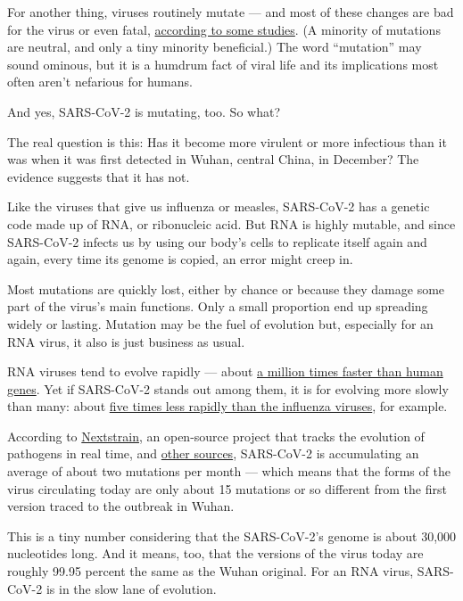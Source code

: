For another thing, viruses routinely mutate --- and most of these
changes are bad for the virus or even fatal,
\href{https://www.ncbi.nlm.nih.gov/pmc/articles/PMC420405/}{according to
some studies}. (A minority of mutations are neutral, and only a tiny
minority beneficial.) The word ``mutation'' may sound ominous, but it is
a humdrum fact of viral life and its implications most often aren't
nefarious for humans.

And yes, SARS-CoV-2 is mutating, too. So what?

The real question is this: Has it become more virulent or more
infectious than it was when it was first detected in Wuhan, central
China, in December? The evidence suggests that it has not.

Like the viruses that give us influenza or measles, SARS-CoV-2 has a
genetic code made up of RNA, or ribonucleic acid. But RNA is highly
mutable, and since SARS-CoV-2 infects us by using our body's cells to
replicate itself again and again, every time its genome is copied, an
error might creep in.

Most mutations are quickly lost, either by chance or because they damage
some part of the virus's main functions. Only a small proportion end up
spreading widely or lasting. Mutation may be the fuel of evolution but,
especially for an RNA virus, it also is just business as usual.

RNA viruses tend to evolve rapidly --- about
\href{https://journals.plos.org/plosbiology/article?id=10.1371/journal.pbio.3000003}{a
million times faster than human genes}. Yet if SARS-CoV-2 stands out
among them, it is for evolving more slowly than many: about
\href{https://www.biorxiv.org/content/10.1101/2020.05.04.077735v1.abstract}{five
times less rapidly than the influenza viruses}, for example.

According to \href{https://nextstrain.org/}{Nextstrain}, an open-source
project that tracks the evolution of pathogens in real time, and
\href{https://www.sciencemag.org/news/2020/07/pandemic-virus-slowly-mutating-it-getting-more-dangerous}{other
sources}, SARS-CoV-2 is accumulating an average of about two mutations
per month --- which means that the forms of the virus circulating today
are only about 15 mutations or so different from the first version
traced to the outbreak in Wuhan.

This is a tiny number considering that the SARS-CoV-2's genome is about
30,000 nucleotides long. And it means, too, that the versions of the
virus today are roughly 99.95 percent the same as the Wuhan original.
For an RNA virus, SARS-CoV-2 is in the slow lane of evolution.

